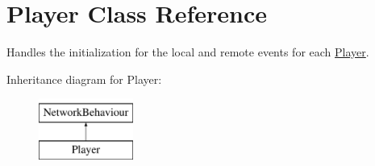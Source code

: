 \hypertarget{class_player}{}\section{Player Class Reference}
\label{class_player}


Handles the initialization for the local and remote events for each \hyperlink{class_player}{Player}.  


Inheritance diagram for Player\+:\begin{figure}[H]
\begin{center}
\leavevmode
\includegraphics[height=2.000000cm]{class_player}
\end{center}
\end{figure}
